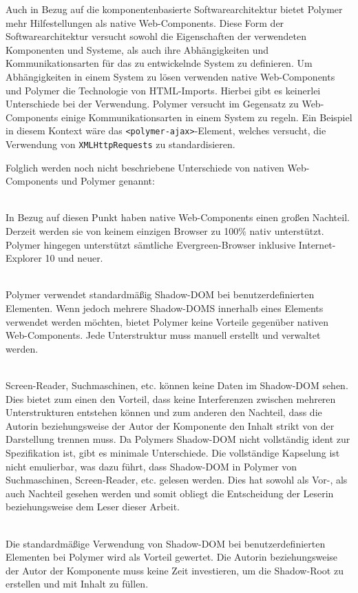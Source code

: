Auch in Bezug auf die komponentenbasierte Softwarearchitektur bietet Polymer mehr Hilfestellungen als native Web-Components. Diese Form der Softwarearchitektur versucht sowohl die Eigenschaften der verwendeten Komponenten und Systeme, als auch ihre Abhängigkeiten und Kommunikationsarten für das zu entwickelnde System zu definieren. Um Abhängigkeiten in einem System zu lösen verwenden native Web-Components und Polymer die Technologie von HTML-Imports. Hierbei gibt es keinerlei Unterschiede bei der Verwendung.
Polymer versucht im Gegensatz zu Web-Components einige Kommunikationsarten in einem System zu regeln. Ein Beispiel in diesem Kontext wäre das \lstinline|<polymer-ajax>|-Element, welches versucht, die Verwendung von \lstinline|XMLHttpRequests| zu standardisieren.

Folglich werden noch nicht beschriebene Unterschiede von nativen Web-Components und Polymer genannt:
\begin{enumerate}
\hfill \\
In Bezug auf diesen Punkt haben native Web-Components einen großen Nachteil. Derzeit werden sie von keinem einzigen Browser zu 100\% nativ unterstützt. Polymer hingegen unterstützt sämtliche \glqq Evergreen\grqq -Browser inklusive Internet-Explorer 10 und neuer.

\hfill \\
Polymer verwendet standardmäßig Shadow-DOM bei benutzerdefinierten Elementen. Wenn jedoch mehrere Shadow-DOMS innerhalb eines Elements verwendet werden möchten, bietet Polymer keine Vorteile gegenüber nativen Web-Components. Jede Unterstruktur muss manuell erstellt und verwaltet werden.

\hfill \\
Screen-Reader, Suchmaschinen, etc. können keine Daten im Shadow-DOM sehen. Dies bietet zum einen den Vorteil, dass keine Interferenzen zwischen mehreren Unterstrukturen entstehen können und zum anderen den Nachteil, dass die Autorin beziehungsweise der Autor der Komponente den Inhalt strikt von der Darstellung trennen muss.
Da Polymers Shadow-DOM nicht vollständig ident zur Spezifikation ist, gibt es minimale Unterschiede. Die vollständige Kapselung ist nicht emulierbar, was dazu führt, dass Shadow-DOM in Polymer von Suchmaschinen, Screen-Reader, etc. gelesen werden. Dies hat sowohl als Vor-, als auch Nachteil gesehen werden und somit obliegt die Entscheidung der Leserin beziehungsweise dem Leser dieser Arbeit.

\hfill \\
Die standardmäßige Verwendung von Shadow-DOM bei benutzerdefinierten Elementen bei Polymer wird als Vorteil gewertet. Die Autorin beziehungsweise der Autor der Komponente muss keine Zeit investieren, um die Shadow-Root zu erstellen und mit Inhalt zu füllen.

\end{enumerate}